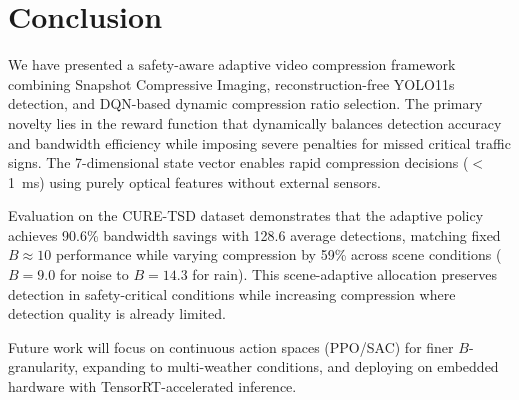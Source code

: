 \documentclass[10pt,journal]{IEEEtran}
\begin{document}

\section{Conclusion}

We have presented a safety-aware adaptive video compression framework combining Snapshot Compressive Imaging, reconstruction-free YOLO11s detection, and DQN-based dynamic compression ratio selection. The primary novelty lies in the reward function that dynamically balances detection accuracy and bandwidth efficiency while imposing severe penalties for missed critical traffic signs. The 7-dimensional state vector enables rapid compression decisions ($<$1~ms) using purely optical features without external sensors.

Evaluation on the CURE-TSD dataset demonstrates that the adaptive policy achieves 90.6\% bandwidth savings with 128.6 average detections, matching fixed $B{\approx}10$ performance while varying compression by 59\% across scene conditions ($B{=}9.0$ for noise to $B{=}14.3$ for rain). This scene-adaptive allocation preserves detection in safety-critical conditions while increasing compression where detection quality is already limited.

Future work will focus on continuous action spaces (PPO/SAC) for finer $B$-granularity, expanding to multi-weather conditions, and deploying on embedded hardware with TensorRT-accelerated inference.




\end{document}

